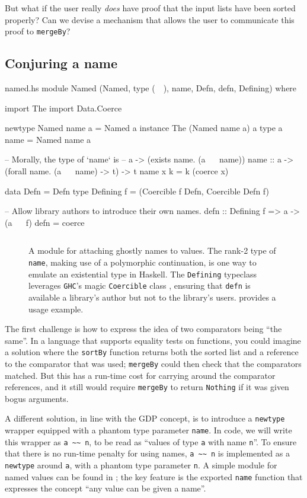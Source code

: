 \documentclass[format=sigplan, review=false, screen=true]{acmart}
\begin{document}
But what if the user really \emph{does} have proof that the input lists have
been sorted properly? Can we devise a mechanism that allows the user to communicate
this proof to \texttt{mergeBy}?

\subsection{Conjuring a name}

\begin{filecontents*}{named.hs}
module Named
  (Named, type (~~), name, Defn, defn, Defining) where

import The
import Data.Coerce

newtype Named name a = Named a
instance The (Named name a) a
type a ~~ name = Named name a

-- Morally, the type of `name` is
--      a -> (exists name. (a ~~ name))
name :: a -> (forall name. (a ~~ name) -> t) -> t
name x k = k (coerce x)

data Defn = Defn
type Defining f = (Coercible f Defn, Coercible Defn f)

-- Allow library authors to introduce their own names.
defn :: Defining f => a -> (a ~~ f)
defn = coerce
\end{filecontents*}
\begin{figure}[b]
  \inputminted{haskell}{named.hs}
  \caption{A module for attaching ghostly names to values. The rank-2 type of \texttt{name},
    making use of a polymorphic continuation, is one way to emulate an existential type in
    Haskell. The \texttt{Defining} typeclass
    leverages \texttt{GHC}'s magic \texttt{Coercible} class \cite{Breitner:2014:SZC:2692915.2628141},
    ensuring that \texttt{defn} is available a library's author but not
    to the library's users.  provides a usage example.\label{name-module}}
\end{figure}


The first challenge is how to express the idea of two  comparators
being ``the same''. In a language that supports equality tests on functions,
you could imagine a solution where the \texttt{sortBy} function returns both the sorted
list and a reference to the comparator that was used; \texttt{mergeBy} could
then check that the comparators matched. But this has a run-time cost for carrying
around the comparator references, and it still would require \texttt{mergeBy} to
return \texttt{Nothing} if it was given bogus arguments.

A different solution, in line with the GDP concept, is to introduce a \texttt{newtype} wrapper equipped with
a phantom type parameter \texttt{name}.
In code, we will write this wrapper as \verb|a ~~ n|, to be read as
``values of type \texttt{a} with name \texttt{n}''. To ensure that there is no
run-time penalty for using names, \verb|a ~~ n| is implemented as a \texttt{newtype}
around \texttt{a}, with a phantom type parameter \texttt{n}. A simple module for named values
can be found in ; the key feature is the exported \texttt{name}
function that expresses the concept ``any value can be given a name''.
\end{document}
